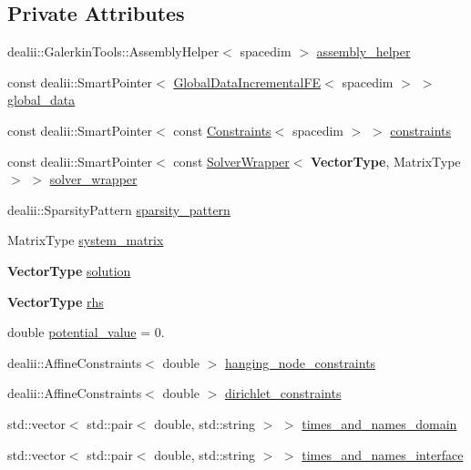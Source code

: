 \subsection*{Private Attributes}
\begin{DoxyCompactItemize}
\item 
dealii\+::\+Galerkin\+Tools\+::\+Assembly\+Helper$<$ spacedim $>$ \hyperlink{classincremental_f_e_1_1_f_e_model_a05d117d3d24815875729bf0219efb95a}{assembly\+\_\+helper}
\item 
const dealii\+::\+Smart\+Pointer$<$ \hyperlink{classincremental_f_e_1_1_global_data_incremental_f_e}{Global\+Data\+Incremental\+FE}$<$ spacedim $>$ $>$ \hyperlink{classincremental_f_e_1_1_f_e_model_aa0619a9d4856459cfcdaf6fb82995496}{global\+\_\+data}
\item 
const dealii\+::\+Smart\+Pointer$<$ const \hyperlink{classincremental_f_e_1_1_constraints}{Constraints}$<$ spacedim $>$ $>$ \hyperlink{classincremental_f_e_1_1_f_e_model_a86375a464ff76f02e74db667f453c6fa}{constraints}
\item 
const dealii\+::\+Smart\+Pointer$<$ const \hyperlink{classincremental_f_e_1_1_solver_wrapper}{Solver\+Wrapper}$<$ {\bf Vector\+Type}, Matrix\+Type $>$ $>$ \hyperlink{classincremental_f_e_1_1_f_e_model_a0340e6f1c6949ff2467cd55fb4264575}{solver\+\_\+wrapper}
\item 
dealii\+::\+Sparsity\+Pattern \hyperlink{classincremental_f_e_1_1_f_e_model_aa9415f85bd0dde5e62f4f4047f3d6837}{sparsity\+\_\+pattern}
\item 
Matrix\+Type \hyperlink{classincremental_f_e_1_1_f_e_model_a630cedd2c40193ffe48de47368922aec}{system\+\_\+matrix}
\item 
{\bf Vector\+Type} \hyperlink{classincremental_f_e_1_1_f_e_model_a47dd80ff66ec302a9854f522c8a7246d}{solution}
\item 
{\bf Vector\+Type} \hyperlink{classincremental_f_e_1_1_f_e_model_ac14a70972f9d05ee4174070090b6f339}{rhs}
\item 
double \hyperlink{classincremental_f_e_1_1_f_e_model_a6ea0377dc55d432c82bc7ccdd8201932}{potential\+\_\+value} = 0.
\item 
dealii\+::\+Affine\+Constraints$<$ double $>$ \hyperlink{classincremental_f_e_1_1_f_e_model_a0f155b0f56492027fcbb2f7982d42fcf}{hanging\+\_\+node\+\_\+constraints}
\item 
dealii\+::\+Affine\+Constraints$<$ double $>$ \hyperlink{classincremental_f_e_1_1_f_e_model_a305f5762e5476d48921f6c371df0ab41}{dirichlet\+\_\+constraints}
\item 
std\+::vector$<$ std\+::pair$<$ double, std\+::string $>$ $>$ \hyperlink{classincremental_f_e_1_1_f_e_model_a587711c4f60083ef739f51f315c3dcec}{times\+\_\+and\+\_\+names\+\_\+domain}
\item 
std\+::vector$<$ std\+::pair$<$ double, std\+::string $>$ $>$ \hyperlink{classincremental_f_e_1_1_f_e_model_a519061ab5d7aaf2f8699b766a88f8712}{times\+\_\+and\+\_\+names\+\_\+interface}
\end{DoxyCompactItemize}



